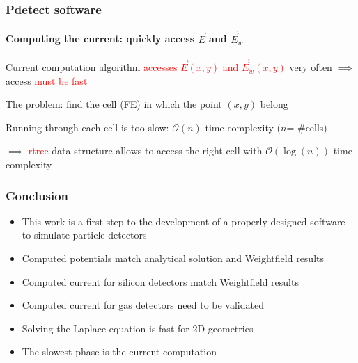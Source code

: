 \documentclass[14pt]{beamer}
\begin{document}
\begin{frame}
  \frametitle{Pdetect software}
  \framesubtitle{Computing the current: quickly access $\vec{E}$ and $\vec{E}_w$}

Current computation algorithm \textcolor{red}{accesses $\vec{E}(x,y)$ and $\vec{E}_w(x,y)$} very
often $\implies$ access \textcolor{red}{must be fast}
\newline

The problem: find the cell (FE) in which the point $(x,y)$ belong
\newline

Running through each cell is too slow: $\mathcal{O}(n)$ time complexity ($n$= $\#$cells)
\newline

$\implies$ \textcolor{red}{rtree} data structure allows to access the right
cell with $\mathcal{O}(\log(n))$ time complexity

\end{frame}

\begin{frame}
  \frametitle{Conclusion}

  \fontsize{13pt}{7.2}\selectfont


\begin{itemize}
  \item This work is a first step to the development of a properly designed
	software to simulate particle detectors
  \item Computed potentials match analytical solution and Weightfield results
  \item Computed current for silicon detectors match Weightfield results
  \item Computed current for gas detectors need to be validated
  \item Solving the Laplace equation is fast for 2D geometries
  \item The slowest phase is the current computation
\end{itemize}


\end{frame}
\end{document}
